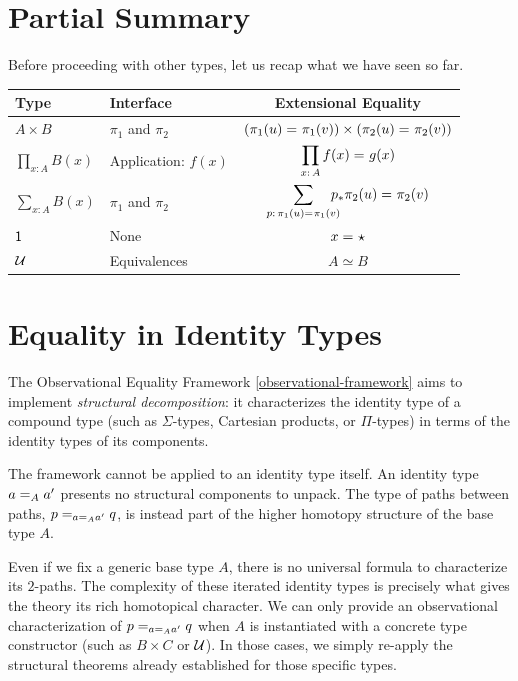 \section*{Partial Summary}
Before proceeding with other types, let us recap what we have seen so far.
\begin{center}
\renewcommand{\arraystretch}{1.5}
    \begin{tabular}{llc}
        \hline\small
        \textbf{Type}
            &\small\textbf{Interface}
            &\small\textbf{Extensional Equality} \\
        \hline
        \small$A\times B$
            &\small $\pi_1$ and $\pi_2$
            &\small $(\pi_1(u)\mathrel{=_{}}\pi_1(v))\times(\pi_2(u)\mathrel{=_{}}\pi_2(v))$\\
        \small$\displaystyle\prod_{x\colon A}B(x)$
            &\small Application: $f(x)$
            &\small$\displaystyle\prod_{x\colon A}f(x)\eq{}g(x)$\\
        \small$\displaystyle\sum_{x\colon A}B(x)$
            &\small$\pi_1$ and $\pi_2$
            &\small$\displaystyle\sum_{p\colon\pi_1(u)\eq{}\pi_1(v)}
                \!\!\!\!\!p_*\pi_2(u)\eq{}\pi_2(v)$
            \\
        \small$\mathsf{1}$
            &\small None
            &\small$x\mathrel{=_{}}\mathsf{\star}$\\
        \small$\mathcal U$
            &\small Equivalences
            &\small $A\simeq B$\\
        \hline
    \end{tabular}
\end{center}

\section{Equality in Identity Types}

The Observational Equality Framework \ref{observational-framework} aims to implement \textsl{structural decomposition}: it characterizes the identity type of a compound type (such as $\Sigma$-types, Cartesian products, or $\Pi$-types) in terms of the identity types of its components. 

The framework cannot be applied to an identity type itself. An identity type $a\mathrel{=_{A}}a'$ presents no structural components to unpack. The type of paths between paths, $p\mathrel{=_{a\mathrel{=_{A}}a'}}q$, is instead part of the higher homotopy structure of the base type $A$. 

Even if we fix a generic base type $A$, there is no universal formula to characterize its $2$-paths. The complexity of these iterated identity types is precisely what gives the theory its rich homotopical character. We can only provide an observational characterization of $p\mathrel{=_{a\mathrel{=_{A}}a'}}q$ when $A$ is instantiated with a concrete type constructor (such as $B\times C$ or $\mathcal U$). In those cases, we simply re-apply the structural theorems already established for those specific types.

